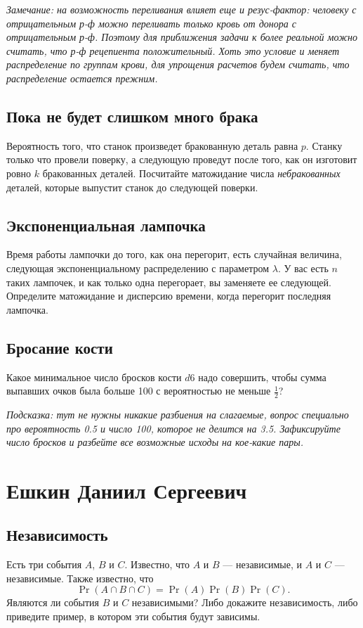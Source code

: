 \documentclass[12pt]{article}
\begin{document}
\emph{Замечание: на возможность переливания влияет еще и резус-фактор: человеку с отрицательным р-ф можно переливать только кровь от донора с отрицательным р-ф. Поэтому для приближения задачи к более реальной можно считать, что р-ф рецепиента положительный. Хоть это условие и меняет распределение по группам крови, для упрощения расчетов будем считать, что распределение остается прежним.}

\subsection{Пока не будет слишком много брака}
Вероятность того, что станок произведет бракованную деталь равна $p$. Станку только что провели поверку, а следующую проведут после того, как он изготовит ровно $k$ бракованных деталей. Посчитайте матожидание числа \emph{небракованных} деталей, которые выпустит станок до следующей поверки.

\subsection{Экспоненциальная лампочка}
Время работы лампочки до того, как она перегорит, есть случайная величина, следующая экспоненциальному распределению с параметром $\lambda$. У вас есть $n$ таких лампочек, и как только одна перегорает, вы заменяете ее следующей. Определите матожидание и дисперсию времени, когда перегорит последняя лампочка.

\subsection{Бросание кости}
Какое минимальное число бросков кости $d6$ надо совершить, чтобы сумма выпавших очков была больше 100 с вероятностью не меньше $\frac{1}{2}$? 

\emph{Подсказка: тут не нужны никакие разбиения на слагаемые, вопрос специально про вероятность 0.5 и число 100, которое не делится на 3.5. Зафиксируйте число бросков и разбейте все возможные исходы на кое-какие пары.}

\newpage
\section{Ешкин Даниил Сергеевич}

\subsection{Независимость}
Есть три события $A$, $B$ и $C$. Известно, что $A$ и $B$ --- независимые, и $A$ и $C$ --- независимые. Также известно, что \[\Pr(A \cap B \cap C) = \Pr(A)\Pr(B)\Pr(C).\] Являются ли события $B$ и $C$ независимыми? Либо докажите независимость, либо приведите пример, в котором эти события будут зависимы.
\end{document}
